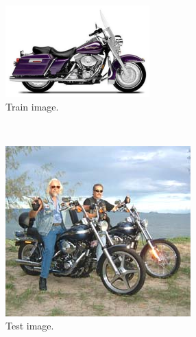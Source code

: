 \begin{figure}[b]
    \centering
    \begin{subfigure}[b]{0.30\textwidth}
        \centering
        \includegraphics[width=\textwidth]{tudtrain}
        \caption{Train image.}
        \label{fig:tud1}
    \end{subfigure}
    ~
    \begin{subfigure}[b]{0.25\textwidth}
        \centering
        \includegraphics[width=\textwidth]{tudtest1}
        \caption{Test image.}
        \label{fig:tud2}
    \end{subfigure}
    ~
    \begin{subfigure}[b]{0.30\textwidth}

\end{subfigure}
\end{figure}
